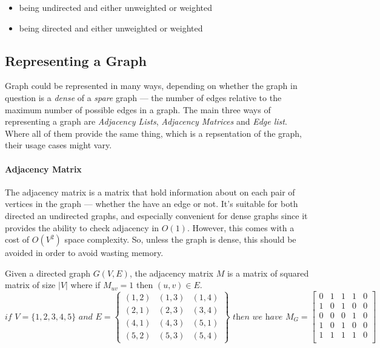 \documentclass[12pt]{article}
\begin{document}
\begin{itemize}
\item being undirected and either unweighted or weighted
\item being directed and either unweighted or weighted
\end{itemize}

\subsection{Representing a Graph}

Graph could be represented in many ways, depending on whether the graph in question is a \textit{dense} of a \textit{spare} graph --- the number of edges relative to the maximum number of possible edges in a graph. The main three ways of representing a graph are \textit{Adjacency Lists}, \textit{Adjacency Matrices} and \textit{Edge list}. Where all of them provide the same thing, which is a repsentation of the graph, their usage cases might vary.

\paragraph{Adjacency Matrix}

The adjacency matrix is a matrix that hold information about on each pair of vertices in the graph --- whether the have an edge or not. It's suitable for both directed an undirected graphs, and especially convenient for dense graphs since it provides the ability to check adjacency in $O(1)$. However, this comes with a cost of $O(V^2)$ space complexity. So, unless the graph is dense, this should be avoided in order to avoid wasting memory.

Given a directed graph $G(V, E)$, the adjacency matrix $M$ is a matrix of squared matrix of size $|V|$ where if $M_{uv} = 1$ then $(u,v) \in E$. \[
  \textit{if } V=\{1,2,3,4,5\} \textit{ and } E=\left\{  \begin{matrix}
      (1,2) & (1,3) & (1,4) \\
      (2,1) & (2,3) & (3,4) \\
      (4,1) & (4,3) & (5,1) \\
      (5,2) & (5,3) & (5,4)
    \end{matrix}
  \right\}  \textit{ then we have }
  M_G =
  \begin{bmatrix}
    0 & 1 & 1 & 1 & 0 \\
    1 & 0 & 1 & 0 & 0 \\
    0 & 0 & 0 & 1 & 0 \\
    1 & 0 & 1 & 0 & 0 \\
    1 & 1 & 1 & 1 & 0 \\
  \end{bmatrix}
\]
\end{document}
